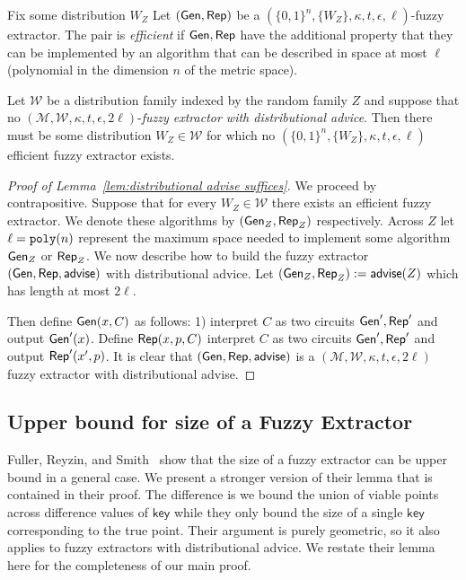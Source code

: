 \begin{definition}
Fix some distribution $W_Z$ Let $({\mathsf{Gen}}, {\mathsf{Rep}})$ be a $(\{0,1\}^n, \{W_Z\}, \kappa, t, \epsilon, \ell)$-fuzzy extractor.  The pair is \emph{efficient} if ${\mathsf{Gen}}, {\mathsf{Rep}}$ have the  additional property that they can be implemented by an algorithm that can be described in space at most $\ell$ (polynomial in the dimension $n$ of the metric space).
\end{definition}

\begin{lemma}

Let $\mathcal{W}$ be a distribution family indexed by the random family $Z$ and suppose that no $(\mathcal{M}, \mathcal{W}, \kappa, t, \epsilon, 2\ell)$-\emph{fuzzy extractor with distributional advice}.  Then there must be some distribution $W_Z \in \mathcal{W}$ for which no  $(\{0,1\}^n, \{W_Z\}, \kappa, t, \epsilon, \ell)$ efficient fuzzy extractor exists.
\label{lem:distributional advise suffices}
\end{lemma}
\begin{proof}[Proof of Lemma~\ref{lem:distributional advise suffices}]
We proceed by contrapositive.  Suppose that for every $W_Z\in\mathcal{W}$ there exists an efficient fuzzy extractor.  We denote these algorithms by $({\mathsf{Gen}}_Z, {\mathsf{Rep}}_Z)$ respectively.  Across $Z$ let $\ell = \mathtt{poly}(n)$ represent the maximum space needed to implement some algorithm ${\mathsf{Gen}}_Z$ or ${\mathsf{Rep}}_Z$. We now describe how to build the fuzzy extractor $({\mathsf{Gen}}, {\mathsf{Rep}}, {\mathsf{advise}})$ with distributional advice.  Let $({\mathsf{Gen}}_Z, {\mathsf{Rep}}_Z) := {\mathsf{advise}}(Z)$ which has length at most $2\ell$.

Then define ${\mathsf{Gen}}(x, C)$ as follows: 1) interpret $C$ as two circuits ${\mathsf{Gen}}', {\mathsf{Rep}}'$ and output ${\mathsf{Gen}}'(x)$.  Define ${\mathsf{Rep}}(x, p, C)$ interpret $C$ as two circuits ${\mathsf{Gen}}', {\mathsf{Rep}}'$ and output ${\mathsf{Rep}}'(x', p)$.  It is clear that $({\mathsf{Gen}}, {\mathsf{Rep}}, {\mathsf{advise}})$ is a $(\mathcal{M}, \mathcal{W}, \kappa, t, \epsilon, 2\ell)$ fuzzy extractor with distributional advise.
\end{proof}

\subsection{Upper bound for size of a Fuzzy Extractor}
Fuller, Reyzin, and Smith~\cite{fuller2016fuzzy,fuller2020fuzzy} show that the size of a fuzzy extractor can be upper bound in a general case.  We present a stronger version of their lemma that is contained in their proof.  The difference is we bound the union of viable points across difference values of $\mathsf{key}$ while they only bound the size of a single $\mathsf{key}$ corresponding to the true point.  Their argument is purely geometric, so it also applies to fuzzy extractors with distributional advice. 
We restate their lemma here for the completeness of our main proof. 

